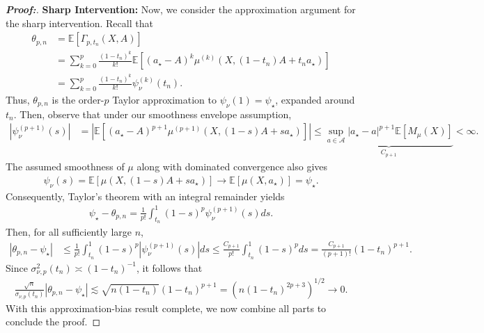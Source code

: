 \documentclass[11pt,twoside]{article}
\theoremstyle{definition}
\theoremstyle{remark}
\begin{document}
\begin{proof}[\textbf{Proof:}]
\textbf{Sharp Intervention:} Now, we consider the approximation argument for the sharp intervention. Recall that
\begin{align*}
    \theta_{p,n} &=\mathbb{E}\!\left[\Gamma_{p,t_n}(X,A)\right] \\
    &= \sum_{k=0}^{p} \frac{(1-t_n)^k}{k!} \mathbb{E}\!\left[ (a_\star-A)^k \mu^{(k)} \!\left(X,(1-t_n)A+t_na_\star\right) \right] \\
    &= \sum_{k=0}^{p} \frac{(1-t_n)^k}{k!} \psi_\nu^{(k)}(t_n).
\end{align*}
Thus, $\theta_{p,n}$ is the order-$p$ Taylor approximation to $\psi_\nu(1)=\psi_\star$, expanded around $t_n$. Then, observe that under our smoothness envelope assumption,
\begin{align*}
    \left|\psi_\nu^{(p+1)}(s)\right| &= \left| \mathbb{E}\!\left[ (a_\star-A)^{p+1} \mu^{(p+1)}\!\left(X,(1-s)A+sa_\star\right) \right] \right| \leq \underbrace{\sup_{a\in\mathcal A}|a_\star-a|^{p+1}\mathbb{E}[M_\mu(X)]}_{C_{p+1}} <\infty.
\end{align*}
The assumed smoothness of $\mu$ along with dominated convergence also gives
\begin{align*}
    \psi_\nu(s) = \mathbb{E}\!\left[\mu\!\left(X,(1-s)A+sa_\star\right) \right] \longrightarrow \mathbb{E}[\mu(X,a_\star)] = \psi_\star.
\end{align*}
Consequently, Taylor's theorem with an integral remainder yields
\begin{align*}
    \psi_\star-\theta_{p,n} = \frac{1}{p!}
    \int_{t_n}^{1} (1-s)^p\psi_\nu^{(p+1)}(s)ds.
\end{align*}
Then, for all sufficiently large $n$,
\begin{align*}
    |\theta_{p,n}-\psi_\star| &\leq \frac{1}{p!} \int_{t_n}^{1} (1-s)^p \left|\psi_\nu^{(p+1)}(s)\right|ds \leq \frac{C_{p+1}}{p!} \int_{t_n}^{1}(1-s)^p ds = \frac{C_{p+1}}{(p+1)!} (1-t_n)^{p+1}.
\end{align*}
Since $\sigma_{\nu,p}^2(t_n)\asymp(1-t_n)^{-1}$, it follows that
\begin{align*}
    \frac{\sqrt{n}}{\sigma_{\nu,p}(t_n)} |\theta_{p,n}-\psi_\star| \lesssim \sqrt{n(1-t_n)}(1-t_n)^{p+1} = \left( n(1-t_n)^{2p+3} \right)^{1/2} \longrightarrow 0.
\end{align*}
With this approximation-bias result complete, we now combine all parts to conclude the proof.


\end{proof}
\end{document}
